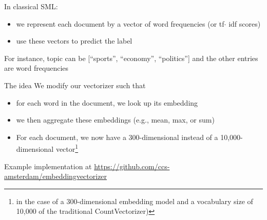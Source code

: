 \begin{frame}{In classical SML:}
\begin{itemize}[<+->]
\item we represent each document by a vector of word frequencies (or tf$\cdot$ idf scores)
\item use these vectors to predict the label
\end{itemize}
\end{frame}


\begin{frame}[plain]
        	\begin{table}[]
		\raggedright	
		For instance, topic can be [``sports'', ``economy'', ``politics''] and the other entries are word frequencies
	\end{table}
\end{frame}



\begin{frame}{The idea}
  We modify our vectorizer such that
  \begin{itemize}[<+->]
  \item for each word in the document, we look up its embedding
  \item we then aggregate these embeddings (e.g., mean, max, or sum)
  \item For each document, we now have a 300-dimensional instead of a 10,000-dimensional vector\footnote{in the case of a 300-dimensional embedding model and a vocabulary size of 10,000 of the traditional CountVectorizer)}
  \end{itemize}
\tiny{Example implementation at \url{https://github.com/ccs-amsterdam/embeddingvectorizer}}	
\end{frame}



